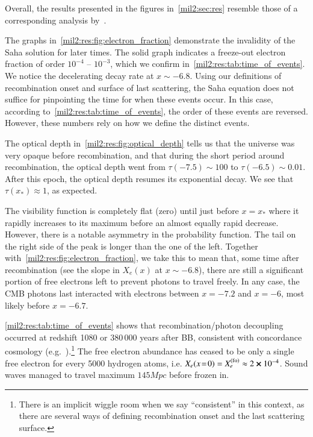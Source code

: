 



Overall, the results presented in the figures in~\cref{mil2:sec:res} resemble those of a corresponding analysis by~\citet[see][Fig.~1,~2]{Callin2006}.


The graphs in~\cref{mil2:res:fig:electron_fraction} demonstrate the invalidity of the Saha solution for later times. The solid graph indicates a freeze-out electron fraction of order $10^{-4}$ -- $10^{-3}$, which we confirm in~\cref{mil2:res:tab:time_of_events}. We notice the decelerating decay rate at $x\sim -6.8$. Using our definitions of recombination onset and surface of last scattering, the Saha equation does not suffice for pinpointing the time for when these events occur. In this case, according to~\cref{mil2:res:tab:time_of_events}, the order of these events are reversed. However, these numbers rely on how we define the distinct events.

The optical depth in~\cref{mil2:res:fig:optical_depth} tells us that the universe was very opaque before recombination, and that during the short period around recombination, the optical depth went from $\tau(-7.5)\sim 100$ to $\tau( -6.5)\sim 0.01$. After this epoch, the optical depth resumes its exponential decay. We see that $\tau(x_*)\approx 1$, as expected. 


The visibility function is completely flat (zero) until just before $x=x_*$ where it rapidly increases to its maximum before an almost equally rapid decrease. However, there is a notable asymmetry in the probability function. The tail on the right side of the peak is longer than the one of the left. Together with~\cref{mil2:res:fig:electron_fraction}, we take this to mean that, some time after recombination (see the slope in $X_e(x)$ at $x\sim -6.8$), there are still a significant portion of free electrons left to prevent photons to travel freely. In any case, the CMB photons last interacted with electrons between $x=-7.2$ and $x=-6$, most likely before $x=-6.7$.

\cref{mil2:res:tab:time_of_events} shows that recombination/photon decoupling occurred at redshift 1080 or 380\,000 years after BB, consistent with concordance cosmology (e.g.~\citet[Tab.~3.1]{Baumann}).\footnote{There is an implicit wiggle room when we say ``consistent'' in this context, as there are several ways of defining recombination onset and the last scattering surface.} The free electron abundance has ceased to be only a single free electron for every 5000 hydrogen atoms, i.e. $X_e(x\!=\!0) = X_e^\mathrm{(fo)}\approx 2\cross 10^{-4}$. Sound waves managed to travel maximum $145\unit{Mpc}$ before frozen in.

